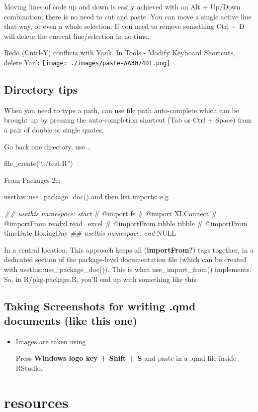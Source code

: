 \documentclass[
  letterpaper,
  DIV=11,
  numbers=noendperiod,
  oneside]{scrreprt}
\newenvironment{Shaded}{\begin{snugshade}}{\end{snugshade}}
\newcommand{\CommentTok}[1]{\textcolor[rgb]{0.37,0.37,0.37}{#1}}
\newcommand{\ConstantTok}[1]{\textcolor[rgb]{0.56,0.35,0.01}{#1}}
\newcommand{\DocumentationTok}[1]{\textcolor[rgb]{0.37,0.37,0.37}{\textit{#1}}}
\begin{document}
Moving lines of code up and down is easily achieved with an Alt +
Up/Down combination; there is no need to cut and paste. You can move a
single active line that way, or even a whole selection. If you need to
remove something Ctrl + D will delete the current line/selection in no
time.

Redo (Cntrl-Y) conflicts with Yank. In Tools - Modify Keyboard
Shortcuts, delete Yank \texttt{[image: ./images/paste-AA3074D1.png]}

\hypertarget{directory-tips}{%
\section{Directory tips}\label{directory-tips}}

When you need to type a path, can use file path auto-complete which can
be brought up by pressing the auto-completion shortcut (Tab or Ctrl +
Space) from a pair of double or single quotes.

Go back one directory, use ..

file\_create(``../test.R'')

From Packages 2e:

usethis::use\_package\_doc() and then list imports: e.g.

\begin{Shaded}
\begin{Highlighting}[]
\DocumentationTok{\#\# usethis namespace: start}
\CommentTok{\#\textquotesingle{} @import fs}
\CommentTok{\#\textquotesingle{} @import XLConnect}
\CommentTok{\#\textquotesingle{} @importFrom readxl read\_excel}
\CommentTok{\#\textquotesingle{} @importFrom tibble tibble}
\CommentTok{\#\textquotesingle{} @importFrom timeDate BoxingDay}
\DocumentationTok{\#\# usethis namespace: end}
\ConstantTok{NULL}
\end{Highlighting}
\end{Shaded}

In a central location. This approach keeps all (\textbf{importFrom?})
tags together, in a dedicated section of the package-level documentation
file (which can be created with usethis::use\_package\_doc()). This is
what use\_import\_from() implements. So, in R/pkg-package.R, you'll end
up with something like this:

\hypertarget{taking-screenshots-for-writing-.qmd-documents-like-this-one}{%
\section{Taking Screenshots for writing .qmd documents (like this
one)}\label{taking-screenshots-for-writing-.qmd-documents-like-this-one}}

\begin{itemize}
\item
  Images are taken using

  Press \textbf{Windows logo key + Shift + S} and paste in a .qmd file
  inside RStudio.
\end{itemize}

\hypertarget{resources}{%
\chapter{resources}\label{resources}}



\printindex
\end{document}
